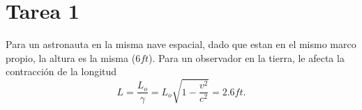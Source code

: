 \section*{Tarea 1}
\begin{mdframed}[style=warning]
	\begin{ejercicio}
		Para un astronauta en la misma nave espacial, dado que estan en el mismo marco propio, la altura es la misma ($6ft$). Para un observador en la tierra, le afecta la contracción de la longitud
			$$ L = \frac{L_o}{\gamma} = L_o \sqrt{1- \frac{v^2}{c^2}} = 2.6ft. $$
	\end{ejercicio}
\end{mdframed}


\begin{mdframed}[style=warning]
	\begin{ejercicio}
		
	\end{ejercicio}
\end{mdframed}
